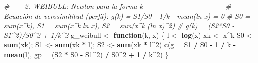 \documentclass[
  spanish,
]{article}
\newenvironment{Shaded}{\begin{snugshade}}{\end{snugshade}}
\newcommand{\AttributeTok}[1]{\textcolor[rgb]{0.13,0.29,0.53}{#1}}
\newcommand{\CommentTok}[1]{\textcolor[rgb]{0.56,0.35,0.01}{\textit{#1}}}
\newcommand{\ControlFlowTok}[1]{\textcolor[rgb]{0.13,0.29,0.53}{\textbf{#1}}}
\newcommand{\DecValTok}[1]{\textcolor[rgb]{0.00,0.00,0.81}{#1}}
\newcommand{\FunctionTok}[1]{\textcolor[rgb]{0.13,0.29,0.53}{\textbf{#1}}}
\newcommand{\NormalTok}[1]{#1}
\newcommand{\OtherTok}[1]{\textcolor[rgb]{0.56,0.35,0.01}{#1}}
\newcommand{\SpecialCharTok}[1]{\textcolor[rgb]{0.81,0.36,0.00}{\textbf{#1}}}
\begin{document}
\begin{Shaded}
\begin{Highlighting}[]
\CommentTok{\# {-}{-}{-}{-} 2. WEIBULL: Newton para la forma k {-}{-}{-}{-}{-}{-}{-}{-}{-}{-}{-}{-}{-}{-}{-}{-}{-}{-}{-}{-}{-}{-}{-}{-}{-}{-}{-}{-}{-}{-}{-}}
\CommentTok{\# Ecuación de verosimilitud (perfil): g(k) = S1/S0 {-} 1/k {-} mean(ln x) = 0}
\CommentTok{\#   S0 = sum(x\^{}k),  S1 = sum(x\^{}k ln x),  S2 = sum(x\^{}k (ln x)\^{}2)}
\CommentTok{\# g\textquotesingle{}(k) = (S2*S0 {-} S1\^{}2)/S0\^{}2 + 1/k\^{}2}
\NormalTok{g\_weibull }\OtherTok{\textless{}{-}} \ControlFlowTok{function}\NormalTok{(k, x) \{}
\NormalTok{  l  }\OtherTok{\textless{}{-}} \FunctionTok{log}\NormalTok{(x)}
\NormalTok{  xk }\OtherTok{\textless{}{-}}\NormalTok{ x}\SpecialCharTok{\^{}}\NormalTok{k}
\NormalTok{  S0 }\OtherTok{\textless{}{-}} \FunctionTok{sum}\NormalTok{(xk); S1 }\OtherTok{\textless{}{-}} \FunctionTok{sum}\NormalTok{(xk }\SpecialCharTok{*}\NormalTok{ l); S2 }\OtherTok{\textless{}{-}} \FunctionTok{sum}\NormalTok{(xk }\SpecialCharTok{*}\NormalTok{ l}\SpecialCharTok{\^{}}\DecValTok{2}\NormalTok{)}
  \FunctionTok{c}\NormalTok{(}\AttributeTok{g  =}\NormalTok{ S1 }\SpecialCharTok{/}\NormalTok{ S0 }\SpecialCharTok{{-}} \DecValTok{1} \SpecialCharTok{/}\NormalTok{ k }\SpecialCharTok{{-}} \FunctionTok{mean}\NormalTok{(l),}
    \AttributeTok{gp =}\NormalTok{ (S2 }\SpecialCharTok{*}\NormalTok{ S0 }\SpecialCharTok{{-}}\NormalTok{ S1}\SpecialCharTok{\^{}}\DecValTok{2}\NormalTok{) }\SpecialCharTok{/}\NormalTok{ S0}\SpecialCharTok{\^{}}\DecValTok{2} \SpecialCharTok{+} \DecValTok{1} \SpecialCharTok{/}\NormalTok{ k}\SpecialCharTok{\^{}}\DecValTok{2}\NormalTok{)}
\NormalTok{\}}


\end{Highlighting}
\end{Shaded}
\end{document}

